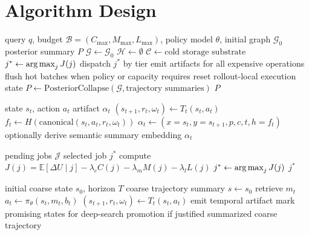 \documentclass[11pt]{article}
\theoremstyle{definition}
\newcommand{\E}{\mathbb{E}}
\newcommand{\argmax}{\operatornamewithlimits{arg\,max}}
\newcommand{\hot}{\mathcal{H}}
\newcommand{\cold}{\mathcal{C}}
\newcommand{\graph}{\mathcal{G}}
\newcommand{\budget}{\mathcal{B}}
\begin{document}
\section{Algorithm Design}

\begin{algorithm}[h]
\caption{CELLAR Orchestrator}
\begin{algorithmic}[1]
\Require query \(q\), budget \(\budget=(C_{\max},M_{\max},L_{\max})\), policy model \(\theta\), initial graph \(\graph_0\)
\Ensure posterior summary \(P\)
\State \(\graph \gets \graph_0\)
\State \(\hot \gets \emptyset\)
\State \(\cold \gets \text{cold storage substrate}\)
    \State \(j^* \gets \argmax_j J(j)\)
    \State dispatch \(j^*\) by tier
    \State emit artifacts for all expensive operations
    \State flush hot batches when policy or capacity requires
    \State reset rollout-local execution state
\EndWhile
\State \(P \gets \mathrm{PosteriorCollapse}(\graph, \text{trajectory summaries})\)
\State \Return \(P\)
\end{algorithmic}
\end{algorithm}

\begin{algorithm}[h]
\caption{Temporal Action}
\begin{algorithmic}[1]
\Require state \(s_t\), action \(a_t\)
\Ensure artifact \(\alpha_t\)
\State \((s_{t+1}, r_t, \omega_t) \gets T_t(s_t, a_t)\)
\State \(f_t \gets H(\mathrm{canonical}(s_t, a_t, r_t, \omega_t))\)
\State \(\alpha_t \gets (x=s_t, y=s_{t+1}, p, c, t, h=f_t)\)
\State optionally derive semantic summary embedding
\State \Return \(\alpha_t\)
\end{algorithmic}
\end{algorithm}

\begin{algorithm}[h]
\caption{Budgeted Scheduler}
\begin{algorithmic}[1]
\Require pending jobs \(\mathcal{J}\)
\Ensure selected job \(j^*\)
    \State compute \(J(j)=\E[\Delta U \mid j]-\lambda_c C(j)-\lambda_m M(j)-\lambda_l L(j)\)
\EndFor
\State \(j^* \gets \argmax_j J(j)\)
\State \Return \(j^*\)
\end{algorithmic}
\end{algorithm}

\begin{algorithm}[h]
\caption{Broad Simulation}
\begin{algorithmic}[1]
\Require initial coarse state \(s_0\), horizon \(T\)
\Ensure coarse trajectory summary
\State \(s \gets s_0\)
    \State retrieve \(m_t\)
    \State \(a_t \gets \pi_\theta(s_t, m_t, b_t)\)
    \State \((s_{t+1}, r_t, \omega_t) \gets T_t(s_t, a_t)\)
    \State emit temporal artifact
    \State mark promising states for deep-search promotion if justified
\EndFor
\State \Return summarized coarse trajectory
\end{algorithmic}
\end{algorithm}
\end{document}
